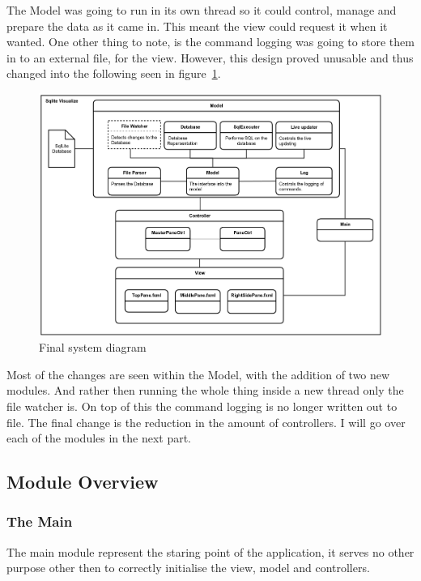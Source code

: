 The Model was going to run in its own thread so it could control, manage and prepare the data as it came in. This meant the view could request it when it wanted. One other thing to note, is the command logging was going to store them in to an external file, for the view. However, this design proved unusable and thus changed into the following seen in figure~\ref{fig:design_new}. 

\begin{figure}[H]
	\centering
	\includegraphics[scale=0.2]{images/system_diagram_new.png}
	\caption{Final system diagram}
	\label{fig:design_new}
\end{figure}

Most of the changes are seen within the Model, with the addition of two new modules. And rather then running the whole thing inside a new thread only the file watcher is. On top of this the command logging is no longer written out to file. The final change is the reduction in the amount of controllers. I will go over each of the modules in the next part.

\subsection{Module Overview}
\label{subsec:module_overview}

\subsubsection{The Main}
\label{subsubsec:main}

The main module represent the staring point of the application, it serves no other purpose other then to correctly initialise the view, model and controllers.

